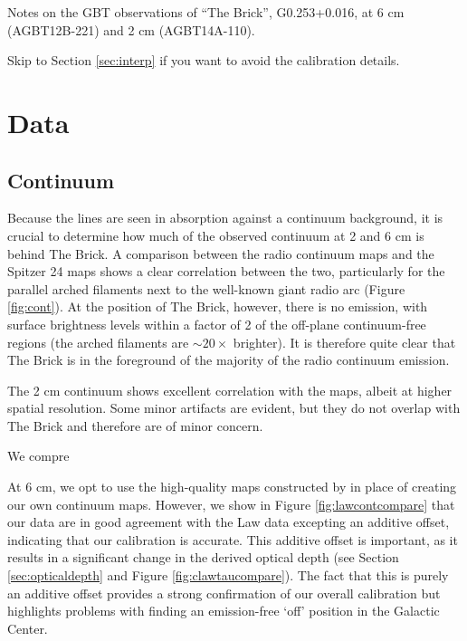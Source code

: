 

Notes on the GBT observations of ``The Brick'', G0.253+0.016, at 6 cm
(AGBT12B-221) and 2 cm (AGBT14A-110).


Skip to Section \ref{sec:interp} if you want to avoid the calibration details.

\section{Data}

\subsection{Continuum}
\label{sec:continuum}
Because the \formaldehyde lines are seen in absorption against a continuum
background, it is crucial to determine how much of the observed continuum at 2
and 6 cm is behind The Brick.  A comparison between the radio continuum maps
and the Spitzer 24 \um maps \citep{Yusef-Zadeh2009a} shows a clear
correlation between the two, particularly for the parallel arched filaments
next to the well-known giant radio arc (Figure \ref{fig:cont}).  At the position of The Brick, however,
there is no emission, with surface brightness levels within a factor of 2 of
the off-plane continuum-free regions (the arched filaments are $\sim20\times$
brighter).  It is therefore quite clear that The Brick is in the foreground of
the majority of the radio continuum emission.

The 2 cm continuum shows excellent correlation with the \citet{Law2008a} maps,
albeit at higher spatial resolution.  Some minor artifacts are evident, but
they do not overlap with The Brick and therefore are of minor concern.

We compre

At 6 cm, we opt to use the high-quality maps constructed by \citet{Law2008a} in
place of creating our own continuum maps.  However, we show in Figure
\ref{fig:lawcontcompare} that our data are in good agreement with the Law data
excepting an additive offset, indicating that our calibration is accurate.
This additive offset is important, as it results in a significant change in the
derived \formaldehyde optical depth (see Section \ref{sec:opticaldepth} and
Figure \ref{fig:clawtaucompare}).  The fact that this is purely an additive
offset provides a strong confirmation of our overall calibration but highlights
problems with finding an emission-free `off' position in the Galactic Center.

